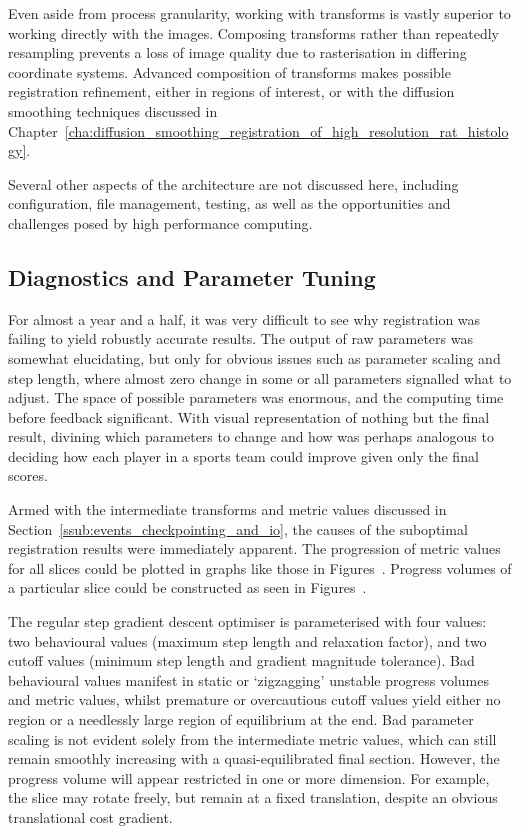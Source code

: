 			Even aside from process granularity, working with transforms is vastly superior to working directly with the images. Composing transforms rather than repeatedly resampling prevents a loss of image quality due to rasterisation in differing coordinate systems. Advanced composition of transforms makes possible registration refinement, either in regions of interest, or with the diffusion smoothing techniques discussed in Chapter~\ref{cha:diffusion_smoothing_registration_of_high_resolution_rat_histology}.
          
          Several other aspects of the architecture are not discussed here, including configuration, file management, testing, as well as the opportunities and challenges posed by high performance computing.
		
  
  \subsection{Diagnostics and Parameter Tuning} %
    \label{sub:diagnostics}
      For almost a year and a half, it was very difficult to see why registration was failing to yield robustly accurate results. The output of raw parameters was somewhat elucidating, but only for obvious issues such as parameter scaling and step length, where almost zero change in some or all parameters signalled what to adjust. The space of possible parameters was enormous, and the computing time before feedback significant. With visual representation of nothing but the final result, divining which parameters to change and how was perhaps analogous to deciding how each player in a sports team could improve given only the final scores.
      
      Armed with the intermediate transforms and metric values discussed in Section~\ref{ssub:events_checkpointing_and_io}, the causes of the suboptimal registration results were immediately apparent. The progression of metric values for all slices could be plotted in graphs like those in Figures~. Progress volumes of a particular slice could be constructed as seen in Figures~.
			
			The regular step gradient descent optimiser is parameterised with four values: two behavioural values (maximum step length and relaxation factor), and two cutoff values (minimum step length and gradient magnitude tolerance). Bad behavioural values manifest in static or `zigzagging' unstable progress volumes and metric values, whilst premature or overcautious cutoff values yield either no region or a needlessly large region of equilibrium at the end. Bad parameter scaling is not evident solely from the intermediate metric values, which can still remain smoothly increasing with a quasi-equilibrated final section. However, the progress volume will appear restricted in one or more dimension. For example, the slice may rotate freely, but remain at a fixed translation, despite an obvious translational cost gradient.
			
